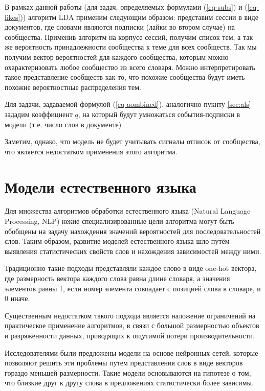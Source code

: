 \documentclass[times,specification,annotation]{itmo-student-thesis}
\begin{document}
В рамках данной работы (для задач, определяемых формулами (\ref{eq-subs}) и (\ref{eq-likes})) алгоритм LDA применим следующим образом: представим сессии в виде документов, где словами являются подписки (лайки во втором случае) на сообщества. Применив алгоритм на корпусе сессий, получим список тем, а так же вероятность принадлежности сообщества к теме для всех сообществ. Так мы получим вектор вероятностей для каждого сообщества, которым можно охарактеризовать любое сообщество из всего словаря. Можно интерпретировать такое представление сообществ как то, что похожие сообщества будут иметь похожие вероятностные распределения тем. 

Для задачи, задаваемой формулой (\ref{eq-aombined}), аналогично пукнту \ref{sec:als} зададим коэффициент $q$, на который будут умножаться события-подписки в модели (т.е. число слов в документе) 
 
Заметим, однако, что модель не будет учитывать сигналы отписок от сообщества, что является недостатком применения этого алгоритма. 

\section{Модели естественного языка}\label{sec:nlp-intro}

Для множества алгоритмов обработки естественного языка (Natural Language Processing, NLP) некие специализированные цели алгоритма могут быть обобщены на задачу нахождения значений вероятностей для последовательностей слов.
Таким образом, развитие моделей естественного языка шло путём выявления статистических свойств слов и нахождения зависимостей между ними.

Традиционно такие подходы представляли каждое слово в виде one-hot вектора, где размерность вектора каждого слова равна длине словаря, а значения элементов равны 1, если номер элемента совпадает с позицией слова в словаре, и 0 иначе.  

Существенным недостатком такого подхода является наложение ограничений на практическое применение алгоритмов, в связи с большой размерностью объектов и разряженности данных, приводящих к ощутимой потери производительности.

Исследователями были предложены модели на основе нейронных сетей\cite{turian2010}, которые позволяют решить эти проблемы путем представления слов в виде векторов гораздо меньшей размерности. Такие модели основываются на гипотезе о том, что близкие друг к другу слова в предложениях статистически более зависимы.
\end{document}
